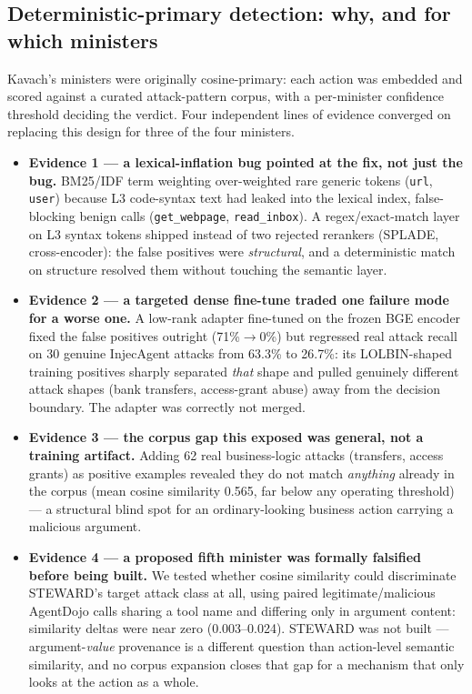 \subsection{Deterministic-primary detection: why, and for which ministers}
\label{sec:deterministic-primary}

Kavach's ministers were originally cosine-primary: each action was
embedded and scored against a curated attack-pattern corpus, with a
per-minister confidence threshold deciding the verdict. Four independent
lines of evidence converged on replacing this design for three of the
four ministers.

\begin{itemize}
\item \textbf{Evidence 1 --- a lexical-inflation bug pointed at the fix, not
just the bug.} BM25/IDF term weighting over-weighted rare generic tokens
(\texttt{url}, \texttt{user}) because L3 code-syntax text had leaked into
the lexical index, false-blocking benign calls (\texttt{get\_webpage},
\texttt{read\_inbox}). A regex/exact-match layer on L3 syntax tokens
shipped instead of two rejected rerankers (SPLADE, cross-encoder): the
false positives were \emph{structural}, and a deterministic match on
structure resolved them without touching the semantic layer.
\item \textbf{Evidence 2 --- a targeted dense fine-tune traded one failure
mode for a worse one.} A low-rank adapter fine-tuned on the frozen BGE
encoder fixed the false positives outright (71\%$\to$0\%) but regressed
real attack recall on 30 genuine InjecAgent attacks from 63.3\% to 26.7\%:
its LOLBIN-shaped training positives sharply separated \emph{that} shape
and pulled genuinely different attack shapes (bank transfers, access-grant
abuse) away from the decision boundary. The adapter was correctly not
merged.
\item \textbf{Evidence 3 --- the corpus gap this exposed was general, not a
training artifact.} Adding 62 real business-logic attacks (transfers,
access grants) as positive examples revealed they do not match
\emph{anything} already in the corpus (mean cosine similarity 0.565, far
below any operating threshold) --- a structural blind spot for an
ordinary-looking business action carrying a malicious argument.
\item \textbf{Evidence 4 --- a proposed fifth minister was formally
falsified before being built.} We tested whether cosine similarity could
discriminate STEWARD's target attack class at all, using paired
legitimate/malicious AgentDojo calls sharing a tool name and differing
only in argument content: similarity deltas were near zero
(0.003--0.024). STEWARD was not built --- argument-\emph{value} provenance
is a different question than action-level semantic similarity, and no
corpus expansion closes that gap for a mechanism that only looks at the
action as a whole.
\end{itemize}

